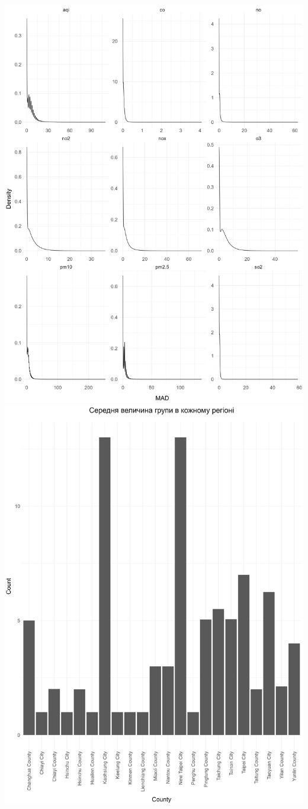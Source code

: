 \documentclass{article}
\begin{document}
\begin{enumerate}
\begin{center}
    \includegraphics[width=6in]{plots/question7/density.png}
    \includegraphics[width=6in]{plots/question7/qq.png}

\end{center}
\end{enumerate}
\end{document}
